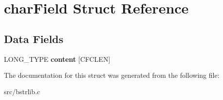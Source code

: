 \hypertarget{structcharField}{}\section{char\+Field Struct Reference}
\label{structcharField}
\subsection*{Data Fields}
\begin{DoxyCompactItemize}
\item 
\hypertarget{structcharField_a8f9248fefe062f32178d961d330454a1}{}L\+O\+N\+G\+\_\+\+T\+Y\+P\+E {\bfseries content} \mbox{[}C\+F\+C\+L\+E\+N\mbox{]}\label{structcharField_a8f9248fefe062f32178d961d330454a1}

\end{DoxyCompactItemize}


The documentation for this struct was generated from the following file\+:\begin{DoxyCompactItemize}
\item 
src/bstrlib.\+c\end{DoxyCompactItemize}
